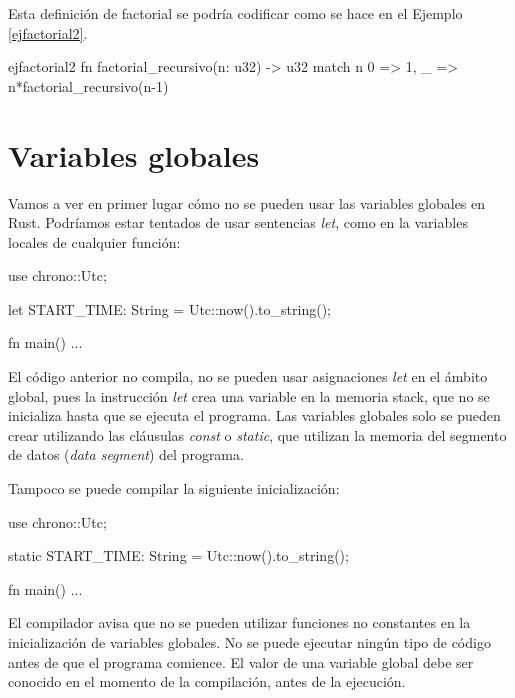 Esta definición de factorial se podría codificar como se hace en el Ejemplo \ref{ejfactorial2}.

\vspace{1em}
\begin{EjemploCodigo}{ejfactorial2}
   fn factorial_recursivo(n: u32) -> u32 {
      match n {
         0 => 1,
         _ => n*factorial_recursivo(n-1)
      }
   }
\end{EjemploCodigo}



\section{Variables globales}
\noindent Vamos a ver en primer lugar cómo no se pueden usar las variables globales en Rust. Podríamos estar tentados de usar sentencias \textit{let}, como en la variables locales de cualquier función:

\vspace{0.7em}
\begin{Codigo}
   use chrono::Utc;
   
   let START_TIME: String = Utc::now().to_string();
   
   fn main() {
      ...
   }
\end{Codigo}

El código anterior no compila, no se pueden usar asignaciones \textit{let} en el ámbito global, pues la instrucción \textit{let} crea una variable en la memoria stack, que no se inicializa hasta que se ejecuta el programa. Las variables globales solo se pueden crear utilizando las cláusulas \textit{const} o \textit{static}, que utilizan la memoria del segmento de datos (\textit{data segment}) del programa. 

Tampoco se puede compilar la siguiente inicialización:

\vspace{0.7em}
\begin{Codigo}
   use chrono::Utc;
   
   static START_TIME: String = Utc::now().to_string();
   
   fn main() {
      ...
   }
\end{Codigo}

El compilador avisa que no se pueden utilizar funciones no constantes en la inicialización de variables globales. No se puede ejecutar ningún tipo de código antes de que el programa comience. El valor de una variable global debe ser conocido en el momento de la compilación, antes de la ejecución. 

